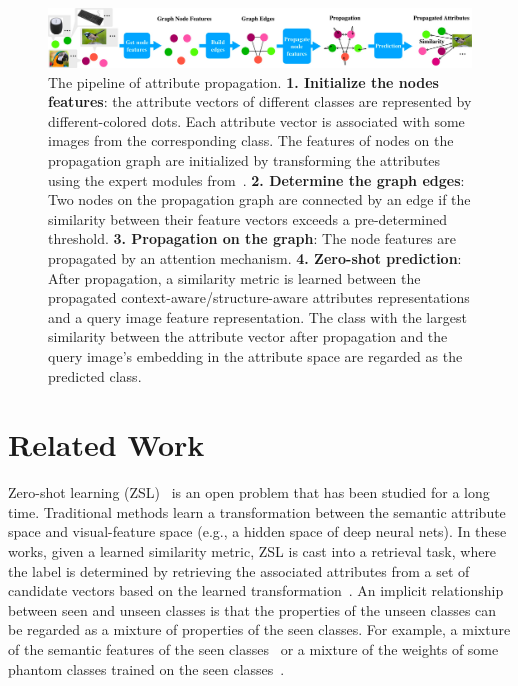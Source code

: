 \documentclass[letterpaper]{article}
\begin{document}
\begin{figure}[t!]
\begin{center}
\includegraphics[width=2\columnwidth]{pipeline-crop.pdf}
\end{center}
\caption{
The pipeline of attribute propagation. \textbf{1. Initialize the nodes features}: the attribute vectors of different classes  are represented by different-colored dots. Each attribute vector is associated with some images from the corresponding class. The features of nodes on the propagation graph are initialized by transforming the attributes using the expert modules from~\cite{zhang2019co}. \textbf{2. Determine the graph edges}: Two nodes on the propagation graph are connected by an edge if the similarity between their feature vectors exceeds a pre-determined threshold. \textbf{3. Propagation on the graph}: The node features are propagated by an attention mechanism. \textbf{4. Zero-shot prediction}: After propagation, a similarity metric is learned between the propagated context-aware/structure-aware attributes representations and a query image feature representation. The class with the largest similarity between the attribute vector after propagation and the query image's embedding in the attribute space are regarded as the predicted class.
}
\label{fig:spn}
\end{figure}

\section{Related Work}
Zero-shot learning (ZSL)~\cite{Larochelle:2008:ZLN:1620163.1620172,lampert2013attribute,xian2018zero} is an open problem that has been studied for a long time.
Traditional methods learn a transformation between the semantic attribute space and visual-feature space (e.g., a hidden space of deep neural nets).
In these works, given a learned similarity metric, ZSL is cast into a retrieval task, where the label is determined by retrieving the associated attributes from a
set of candidate vectors based on the learned transformation~\cite{frome2013devise,akata2015label,akata2015evaluation,romera2015embarrassingly,kodirov2017semantic,xian2016latent,socher2013zero}.
An implicit relationship between seen and unseen classes is that the properties of the unseen classes can be regarded as a mixture of properties of the seen classes. For example, a mixture of the semantic features of the seen classes~\cite{norouzi2013zero} or a mixture of the weights of some phantom classes trained on the seen classes~\cite{changpinyo2016synthesized}.
\end{document}

